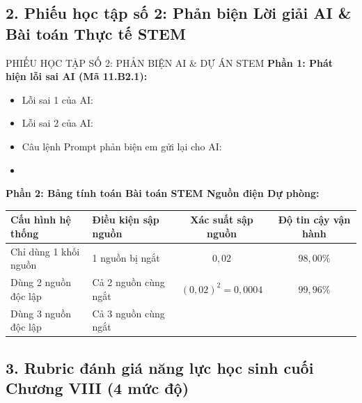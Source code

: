 \documentclass[12pt, a4paper]{article}
\begin{document}
\subsection*{2. Phiếu học tập số 2: Phản biện Lời giải AI \& Bài toán Thực tế STEM}

\begin{pedabox}{PHIẾU HỌC TẬP SỐ 2: PHẢN BIỆN AI \& DỰ ÁN STEM}
\textbf{Phần 1: Phát hiện lỗi sai AI (Mã 11.B2.1):}
\begin{itemize}
    \item Lỗi sai 1 của AI: \dotfill
    \item Lỗi sai 2 của AI: \dotfill
    \item Câu lệnh Prompt phản biện em gửi lại cho AI: \dotfill
    \item \dotfill
\end{itemize}

\textbf{Phần 2: Bảng tính toán Bài toán STEM Nguồn điện Dự phòng:}
\begin{center}
\begin{tabularx}{\linewidth}{|l|X|c|c|}
\hline
\textbf{Cấu hình hệ thống} & \textbf{Điều kiện sập nguồn} & \textbf{Xác suất sập nguồn} & \textbf{Độ tin cậy vận hành} \\ \hline
Chỉ dùng 1 khối nguồn & 1 nguồn bị ngắt & $0{,}02$ & $98{,}00\%$ \\ \hline
Dùng 2 nguồn độc lập & Cả 2 nguồn cùng ngắt & $(0{,}02)^2 = 0{,}0004$ & $99{,}96\%$ \\ \hline
Dùng 3 nguồn độc lập & Cả 3 nguồn cùng ngắt & & \\ \hline
\end{tabularx}
\end{center}
\end{pedabox}

\subsection*{3. Rubric đánh giá năng lực học sinh cuối Chương VIII (4 mức độ)}
\end{document}
